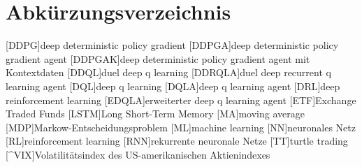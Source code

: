 \chapter*{Abkürzungsverzeichnis}

\begin{acronym}[FOURTEEN]
[DDPG]{deep deterministic policy gradient}
[DDPGA]{deep deterministic policy gradient agent}
[DDPGAK]{deep deterministic policy gradient agent mit Kontextdaten}
[DDQL]{duel deep q learning}
[DDRQLA]{duel deep recurrent q learning agent}
[DQL]{deep q learning}
[DQLA]{deep q learning agent}
[DRL]{deep reinforcement learning}
[EDQLA]{erweiterter deep q learning agent}
[ETF]{Exchange Traded Funds}
[LSTM]{Long Short-Term Memory}
[MA]{moving average}
[MDP]{Markow-Entscheidungsproblem}
[ML]{machine learning}
[NN]{neuronales Netz}
[RL]{reinforcement learning}
[RNN]{rekurrente neuronale Netze}
[TT]{turtle trading}
[\^{}VIX]{Volatilitätsindex des US-amerikanischen Aktienindexes}
\end{acronym}

